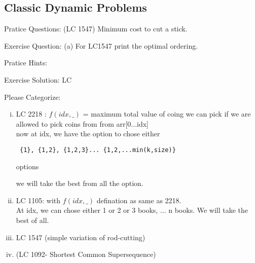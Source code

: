 \subsection{Classic Dynamic Problems}








\vspace{3cm}

Pratice Questions:
(LC 1547) Minimum cost to cut a stick.

Exercise Question:
(a) For LC1547 print the optimal ordering.

Pratice Hints:


Exercise Solution:
LC

Please Categorize:
\begin{enumerate}[(i)]
    \item 
     LC 2218 : $f(idx,\_)$ = maximum total value of coing we can pick if we are allowed to pick coins from from arr[0...idx]\\
     now at idx, we have the option to chose either \begin{verbatim} {1}, {1,2}, {1,2,3}... {1,2,...min(k,size)} \end{verbatim} options
        
     we will take the best from all the option.
    
     \item LC 1105: with $f(idx,\_)$ defination as same as 2218.\\
     At idx, we can chose either 1 or 2 or 3 books, ... n books. We will take the best of all.

     \item LC 1547 (simple variation of rod-cutting)
     \item (LC 1092- Shortest Common Supersequence)
\end{enumerate}
